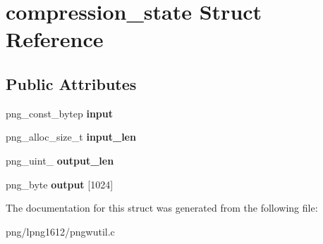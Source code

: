 \hypertarget{structcompression__state}{\section{compression\+\_\+state Struct Reference}
\label{structcompression__state}
}
\subsection*{Public Attributes}
\begin{DoxyCompactItemize}
\item 
\hypertarget{structcompression__state_adf14e1207e8d90e33e92cfb95b468d3b}{png\+\_\+const\+\_\+bytep {\bfseries input}}\label{structcompression__state_adf14e1207e8d90e33e92cfb95b468d3b}

\item 
\hypertarget{structcompression__state_ac02652a570eb1e91af374bf683f6581b}{png\+\_\+alloc\+\_\+size\+\_\+t {\bfseries input\+\_\+len}}\label{structcompression__state_ac02652a570eb1e91af374bf683f6581b}

\item 
\hypertarget{structcompression__state_aea6eff8edf553a973c6fe2b9454d96a0}{png\+\_\+uint\+\_ {\bfseries output\+\_\+len}}\label{structcompression__state_aea6eff8edf553a973c6fe2b9454d96a0}

\item 
\hypertarget{structcompression__state_a8f655613a1bad5d242fb0b5a91420609}{png\+\_\+byte {\bfseries output} \mbox{[}1024\mbox{]}}\label{structcompression__state_a8f655613a1bad5d242fb0b5a91420609}

\end{DoxyCompactItemize}


The documentation for this struct was generated from the following file\+:\begin{DoxyCompactItemize}
\item 
png/lpng1612/pngwutil.\+c\end{DoxyCompactItemize}
